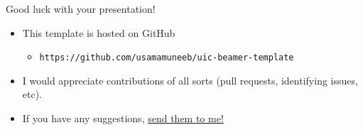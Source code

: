 \documentclass{beamer}
\newcommand{\hrefcol}[2]{\textcolor{uihteal}{\href{#1}{#2}}}
\begin{document}
\begin{frame}{Good luck with your presentation!}
\begin{itemize}
\item This template is hosted on GitHub
    \begin{itemize}
    \item  \texttt{https://github.com/usamamuneeb/uic-beamer-template}
    \end{itemize}
\item  I would appreciate contributions of all sorts (pull requests, identifying issues, etc).
\item  If you have any suggestions,
\hrefcol{mailto:umunee2@uic.edu}{send them to me!}
\end{itemize}
\end{frame}


\backmatter
\end{document}
